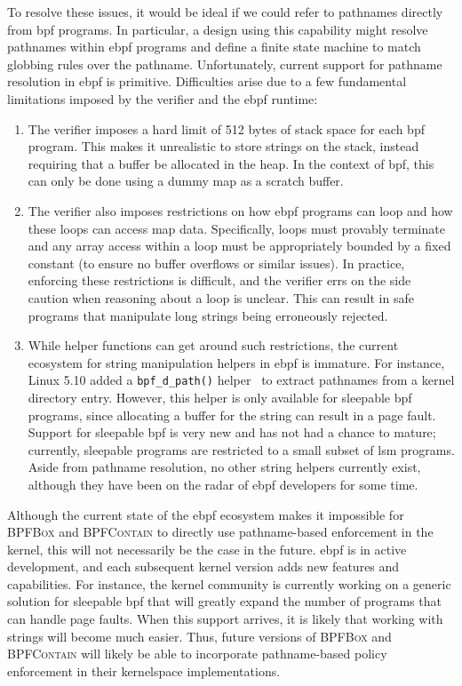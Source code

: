 \documentclass[
  fontsize=12pt,
  titlepage=firstiscover,
  paper=letter,
oneside,
  cleardoublepage=plain,
  parskip=half-,
  DIV=10,
  parindent,
  appendixprefix,
  chapterprefix,
  listof=totoc,
]{scrbook}
\newcommand{\bpfbox}{\textsc{BPFBox}}
\newcommand{\bpfcontain}{\textsc{BPFContain}}
\begin{document}
To resolve these issues, it would be ideal if we could refer to pathnames directly from
\gls{bpf} programs. In particular, a design using this capability might resolve pathnames
within \gls{ebpf} programs and define a finite state machine to match globbing rules over
the pathname. Unfortunately, current support for pathname resolution in \gls{ebpf} is primitive.
Difficulties arise due to a few fundamental limitations imposed by the verifier and the \gls{ebpf}
runtime:
\begin{enumerate}
  \item The verifier imposes a hard limit of 512 bytes of stack space for each \gls{bpf}
  program. This makes it unrealistic to store strings on the stack, instead requiring that
  a buffer be allocated in the heap. In the context of \gls{bpf}, this can only be done
  using a dummy map as a scratch buffer.

  \item The verifier also imposes restrictions on how \gls{ebpf} programs can loop and how
  these loops can access map data. Specifically, loops must provably terminate and any
  array access within a loop must be appropriately bounded by a fixed constant (to ensure
  no buffer overflows or similar issues). In practice, enforcing these restrictions is
  difficult, and the verifier errs on the side caution when reasoning about a loop is unclear.
  This can result in safe programs that manipulate long strings being erroneously rejected.

  \item While helper functions can get around such restrictions, the current ecosystem for
  string manipulation helpers in \gls{ebpf} is immature. For instance, Linux 5.10 added
  a \texttt{bpf\_d\_path()} helper~\cite{olsa2020_d_path} to extract pathnames from
  a kernel directory entry. However, this helper is only available for sleepable \gls{bpf}
  programs, since allocating a buffer for the string can result in a page fault. Support
  for sleepable \gls{bpf} is very new and has not had a chance to mature; currently,
  sleepable programs are restricted to a small subset of \gls{lsm} programs. Aside from
  pathname resolution, no other string helpers currently exist, although they have been on
  the radar of \gls{ebpf} developers for some time.
\end{enumerate}

Although the current state of the \gls{ebpf} ecosystem makes it impossible for \bpfbox{}
and \bpfcontain{} to directly use pathname-based enforcement in the kernel, this will not
necessarily be the case in the future. \gls{ebpf} is in active development, and each
subsequent kernel version adds new features and capabilities. For instance, the kernel
community is currently working on a generic solution for sleepable \gls{bpf} that will
greatly expand the number of programs that can handle page faults. When this support
arrives, it is likely that working with strings will become much easier. Thus, future
versions of \bpfbox{} and \bpfcontain{} will likely be able to incorporate pathname-based
policy enforcement in their kernelspace implementations.
\end{document}
